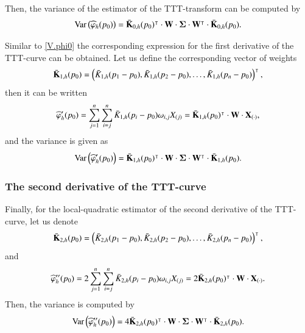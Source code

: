 \documentclass[preprint,12pt]{elsarticle}
\begin{document}
Then, the variance of the estimator of the TTT-transform can be computed by
\begin{equation}\label{V.phi0}
{\rm Var} \left(\widehat{\varphi}_h(p_0)\right)= \bar{\bf K}_{0,h}(p_0)^{\intercal}\cdot {\bf W} \cdot {\boldsymbol{\Sigma}}\cdot  {\bf W}^{\intercal}\cdot \bar{\bf K}_{0,h}(p_0).
\end{equation}


\noindent Similar to \eqref{V.phi0}  the corresponding expression for the first derivative of the TTT-curve can be obtained. Let us define the corresponding vector of weights 
$$\bar{\bf K}_{1,h}(p_0)=\left(\bar{ K}_{1,h}(p_1-p_0), \bar{ K}_{1,h}(p_2-p_0),\ldots,\bar{ K}_{1,h}(p_n-p_0)\right)^{\intercal},$$ 
then it can be written
\begin{equation*}
\widehat{\varphi}'_h(p_0)=  \sum_{j=1}^n \sum_{i=j}^n \bar{K}_{1,h}(p_i-p_0)\omega_{i,j}X_{(j)}=\bar{\bf K}_{1,h}(p_0)^{\intercal} \cdot {\bf W} \cdot{\bf X}_{(\cdot)}, 
\end{equation*}
and the variance is given as
\begin{equation}\label{V.phi1}
{\rm Var} \left(\widehat{\varphi}'_h(p_0)\right)= \bar{\bf K}_{1,h}(p_0)^{\intercal}\cdot {\bf W} \cdot {\boldsymbol{\Sigma}}\cdot  {\bf W}^{\intercal}\cdot \bar{\bf K}_{1,h}(p_0).
\end{equation}
\subsubsection*{The second derivative of the TTT-curve}
\noindent Finally, for the local-quadratic estimator of the second derivative of the TTT-curve, let us denote 
$$\bar{\bf K}_{2,h}(p_0)=\left(\bar{ K}_{2,h}(p_1-p_0), \bar{ K}_{2,h}(p_2-p_0),\ldots,\bar{ K}_{2,h}(p_n-p_0)\right)^{\intercal},$$
and 
\begin{equation*}
\widehat{\varphi}''_h(p_0)= 2 \sum_{j=1}^n \sum_{i=j}^n \bar{K}_{2,h}(p_i-p_0)\omega_{i,j}X_{(j)}=2 \bar{\bf K}_{2,h}(p_0)^{\intercal} \cdot {\bf W} \cdot{\bf X}_{(\cdot)}.
\end{equation*}
Then, the variance is computed by
\begin{equation}\label{V.phi2}
{\rm Var} \left(\widehat{\varphi}''_h(p_0)\right)=4  \bar{\bf K}_{2,h}(p_0)^{\intercal}\cdot {\bf W} \cdot {\boldsymbol{\Sigma}}\cdot  {\bf W}^{\intercal}\cdot \bar{\bf K}_{2,h}(p_0).
\end{equation}
\end{document}
